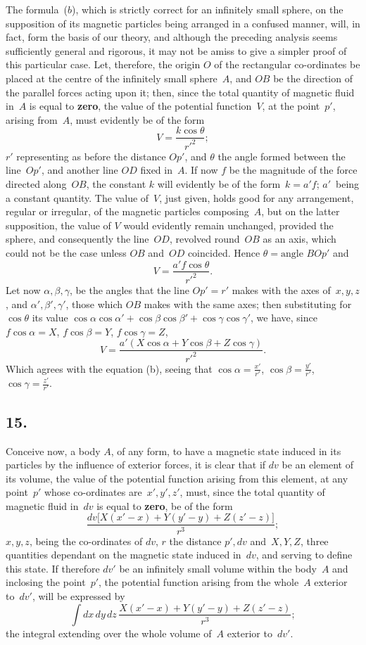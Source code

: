 \documentclass[12pt,notitlepage]{amsart}
\let\Emphasis\textbf
\newcommand\Section[1]{\subsection{{#1}}}
\begin{document}
The formula~($b$), which is strictly correct for an infinitely small sphere,
on the supposition of its magnetic particles being arranged in a confused
manner, will, in fact, form the basis of our theory, and although the preceding
analysis seems sufficiently general and rigorous, it may not be amiss to
give a simpler proof of this particular case. Let, therefore, the origin $O$ of
the rectangular co-ordinates be placed at the centre of the infinitely small
sphere~$A$, and $OB$ be the direction of the parallel forces acting upon it;
then,
since the total quantity of magnetic fluid in~$A$ is equal to \Emphasis{zero},
the value of
the potential function~$V$, at the point~$p'$, arising from~$A$,
must evidently be
of the form
\[
V=\frac{k\cos\theta}{r'^2};
\]
$r'$ representing as before the distance $Op'$,
and $\theta$ the angle formed between
the line~$Op'$, and another line $OD$ fixed in~$A$. If now $f$ be the magnitude
of the force directed along~$OB$, the constant $k$ will evidently be of the
form~${k=a'f}$;
$a'$~being a constant quantity. The value of~$V$, just given, holds
good for any arrangement, regular or irregular, of the magnetic particles
composing~$A$, but on the latter supposition, the value of $V$ would evidently
remain unchanged, provided the sphere, and consequently the line~$OD$, revolved
round~$OB$ as an axis, which could not be the case unless $OB$ and~$OD$
coincided. Hence ${\theta=\text{angle $BOp'$}}$ and
\[
V=\frac{a'f\cos\theta}{r'^2}.
\]
Let now $\alpha,\beta,\gamma$, be the angles that the line $Op'=r'$
makes with the axes
of~$x,y,z$, and $\alpha',\beta',\gamma'$,
those which $OB$ makes with the same axes; then
substituting for $\cos\theta$ its value
$\cos\alpha\cos\alpha'+\cos\beta\cos\beta'+\cos\gamma\cos\gamma'$, we have,
since $f\cos\alpha=X$, $f\cos\beta=Y$, $f\cos\gamma=Z$,
\[
\tag{$b$.}
V=\frac{a'(X\cos\alpha+Y\cos\beta+Z\cos\gamma)}{r'^2}.
\]
Which agrees with the equation (b), seeing that $\cos\alpha=\frac{x'}{r'}$, 
$\cos\beta=\frac{y'}{r'}$, $\cos\gamma=\frac{z'}{r'}$.
\bigskip

\Section{15.}
Conceive now, a body $A$, of any form, to have a magnetic state induced
in its particles by the influence of exterior forces, it is clear that if
$dv$ be an element of its volume, the value of the potential function arising
from this element, at any point~$p'$ whose co-ordinates are~$x',y',z'$, must,
since the total quantity of magnetic fluid in~$dv$ is equal to \Emphasis{zero},
be of the form
\[
\tag{$a$.}
\frac{dv\bigl[X(x'-x)+Y(y'-y)+Z(z'-z)\bigr]}{r^3};
\]
$x,y,z$, being the co-ordinates of $dv$, $r$ the distance $p',dv$ and~$X,Y,Z$,
three quantities dependant on the magnetic state induced in~$dv$, and serving
to define this state. If therefore $dv'$
be an infinitely small volume within the
body~$A$ and inclosing the point~$p'$,
the potential function arising from the whole~$A$
exterior to~$dv'$, will be expressed by
\[
\int dx\,dy\,dz\,
\frac{X(x'-x)+Y(y'-y)+Z(z'-z)}{r^3};
\]
the integral extending over the whole volume of~$A$ exterior to~$dv'$.
\end{document}

